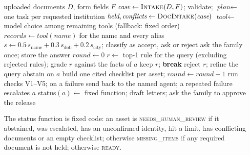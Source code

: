 \documentclass[12pt,a4paper,oneside]{report}
\begin{document}
\begin{algorithm}[H]
\caption{Core loop of Waris (limits: $R_{\max}=6$, $Q_{\max}=2$, $T_{\max}=8$, $L_{\max}=40$).}\label{alg:core}
\footnotesize{}
\begin{algorithmic}[1]
\Require uploaded documents $D$, form fields $F$
\State $\textit{case} \gets \textsc{Intake}(D, F)$; validate; $\textit{plan} \gets$ one task per requested institution
\State $\textit{held}, \textit{conflicts} \gets \textsc{DocIntake}(\textit{case})$
  \State $\textit{tool} \gets$ model choice among remaining tools (fallback: fixed order)
  \State $\textit{records} \gets \textit{tool}(\textit{name})$ for the name and every alias
  \; $s \gets 0.5\,s_{\text{name}}+0.3\,s_{\text{dob}}+0.2\,s_{\text{city}}$; classify as accept, ask or reject \EndFor
\EndFor
{} \State ask the family once; store the answer \EndWhile
\State $\textit{round} \gets 0$
\Repeat
      \State $r \gets$ top-1 rule for the query (excluding rejected rules); grade $r$ against the facts of $a$
       \State keep $r$; \textbf{break} \Else \State reject $r$; refine the query \EndIf
    \EndFor
     \State abstain on $a$ \EndIf
  \EndFor
  \State build one cited checklist per asset; $\textit{round} \gets \textit{round}+1$
  \State run checks V1--V5; on a failure send back to the named agent; a repeated failure escalates $a$
\State status$(a) \gets$ fixed function; draft letters; ask the family to approve the release
\end{algorithmic}
\end{algorithm}

The status function is fixed code: an asset is \textsc{needs\_human\_review} if it abstained, was escalated, has an unconfirmed identity, hit a limit, has conflicting documents or an empty checklist; otherwise \textsc{missing\_items} if any required document is not held; otherwise \textsc{ready}.
\end{document}
